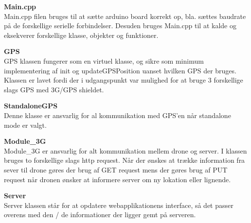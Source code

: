 \newpage

\textbf{Main.cpp} \\
Main.cpp filen bruges til at sætte arduino board korrekt op, bla. sættes baudrate på de forskellige serielle forbindelser. Desuden bruges Main.cpp til at kalde og eksekverer forskellige klasse, objekter og funktioner.

\textbf{GPS} \\
GPS klassen fungerer som en virtuel klasse, og sikre som minimum implementering af init og updateGPSPosition uanset hvilken GPS der bruges. Klassen er lavet fordi der i udgangspunkt var mulighed for at bruge 3 forskellige slags GPS med 3G/GPS shieldet. 

\textbf{StandaloneGPS}\\
Denne klasse er ansvarlig for al kommunikation med GPS'en når standalone mode er valgt. 

\textbf{Module\_3G} \\
Module\_3G er ansvarlig for alt kommunikation mellem drone og server. I klassen bruges to forskellige slags http request. Når der ønskes at trække information fra sever til drone gøres der brug af GET request mens der gøres brug af PUT request når dronen ønsker at informere server om ny lokation eller lignende. 

\textbf{Server} \\
Server klassen står for at opdatere webapplikationens interface, så det passer overens med den / de informationer der ligger gemt på serveren.
